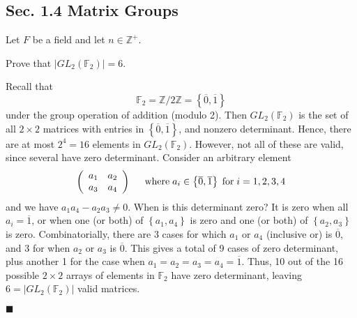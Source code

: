 \documentclass[12pt]{article}
\renewcommand{\qed}{\hfill$\blacksquare$}
\renewenvironment{proof}{\begin{addmargin}[1em]{0em}\begin{newproof}}{\end{newproof}\end{addmargin}\qed}
\newenvironment{problem}[2][Exercise]{\begin{trivlist}
\item[\hskip \labelsep {\bfseries #1}\hskip \labelsep {\bfseries #2.}]}{\end{trivlist}}
\begin{document}
\subsection*{Sec. 1.4 Matrix Groups}
Let $F$ be a field and let $n\in \mathbb{Z}^+$.
\begin{problem}{1.4.1}
Prove that $\left|GL_2\left(\mathbb{F}_2\right)\right|=6$.
\end{problem}
\begin{proof}
Recall that
$$ \mathbb{F}_2 = \mathbb{Z}/2\mathbb{Z} = \left\{ \overline{0}, \overline{1}\right\} $$
under the group operation of addition (modulo 2). Then $GL_2\left(\mathbb{F}_2\right)$ is the set of all $2\times 2$ matrices with entries in $\left\{\overline{0},\overline{1}\right\}$, and nonzero determinant. Hence, there are at most $2^4=16$ elements in $GL_2\left(\mathbb{F}_2\right)$. However, not all of these are valid, since several have zero determinant. Consider an arbitrary element
$$ \left(\begin{array}{cc} a_1 & a_2 \\ a_3 & a_4 \end{array}\right) \hspace{5mm} \text{where} \; a_i\in \left\{\overline{0},\overline{1}\right\} \; \text{for} \; i=1,2,3,4 $$
and we have $a_1a_4-a_2a_3 \neq 0$. When is this determinant zero? It is zero when all $a_i=\overline{1}$, or when one (or both) of $\left\{a_1,a_4\right\}$ is zero and one (or both) of $\left\{a_2,a_3\right\}$ is zero. Combinatorially, there are 3 cases for which $a_1$ or $a_4$ (inclusive or) is $\overline{0}$, and 3 for when $a_2$ or $a_3$ is $\overline{0}$. This gives a total of 9 cases of zero determinant, plus another 1 for the case when $a_1=a_2=a_3=a_4=\overline{1}$. Thus, 10 out of the 16 possible $2\times 2$ arrays of elements in $\mathbb{F}_2$ have zero determinant, leaving $6=\left|GL_2\left(\mathbb{F}_2\right)\right|$ valid matrices.
\end{proof}
\end{document}
